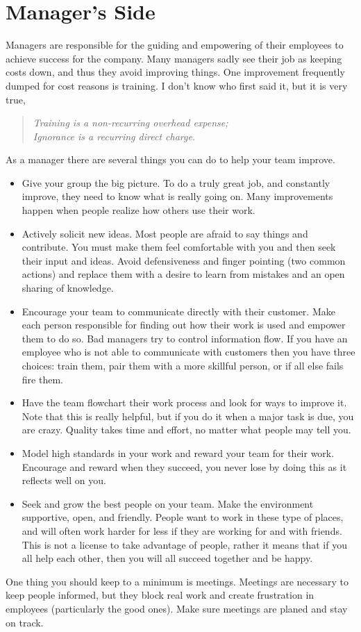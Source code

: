\section{Manager's Side}
Managers are responsible for the guiding and empowering of their employees to achieve success for the company.  Many managers sadly see their job as keeping costs down, and thus they avoid improving things.  One improvement frequently dumped for cost reasons is training.  I don't know who first said it, but it is very true,
\begin{quote}
\emph{Training is a non-recurring overhead expense;\\
Ignorance is a recurring direct charge.}
\end{quote}
As a manager there are several things you can do to help your team improve.
\begin{itemize}
\item Give your group the big picture.  To do a truly great job, and constantly improve, they need to know what is really going on.  Many improvements happen when people realize how others use their work.
\item Actively solicit new ideas.  Most people are afraid to say things and contribute.  You must make them feel comfortable with you and then seek their input and ideas.  Avoid defensiveness and finger pointing (two common actions) and replace them with a desire to learn from mistakes and an open sharing of knowledge.
\item Encourage your team to communicate directly with their customer.  Make each person responsible for finding out how their work is used and empower them to do so.  Bad managers try to control information flow.  If you have an employee who is not able to communicate with customers then you have three choices: train them, pair them with a more skillful person, or if all else fails fire them.
\item Have the team flowchart their work process and look for ways to improve it.  Note that this is really helpful, but if you do it when a major task is due, you are crazy.  Quality takes time and effort, no matter what people may tell you.
\item Model high standards in your work and reward your team for their work.  Encourage and reward when they succeed, you never lose by doing this as it reflects well on you.
\item Seek and grow the best people on your team.  Make the environment supportive, open, and friendly.  People want to work in these type of places, and will often work harder for less if they are working for and with friends.  This is not a license to take advantage of people, rather it means that if you all help each other, then you will all succeed together and be happy.
\end{itemize}
One thing you should keep to a minimum is meetings.  Meetings are necessary to keep people informed, but they block real work and create frustration in employees (particularly the good ones).  Make sure meetings are planed and stay on track.

